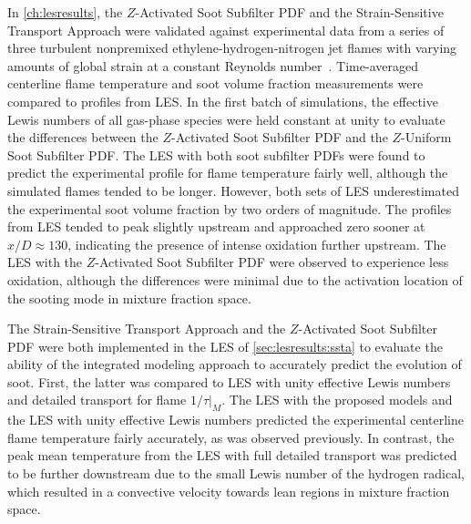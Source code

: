 In \cref{ch:lesresults}, the $Z$-Activated Soot Subfilter PDF and the Strain-Sensitive Transport Approach were validated against experimental data from a series of three turbulent nonpremixed ethylene-hydrogen-nitrogen jet flames with varying amounts of global strain at a constant Reynolds number~\cite{mahmoud2017}. Time-averaged centerline flame temperature and soot volume fraction measurements were compared to profiles from LES. In the first batch of simulations, the effective Lewis numbers of all gas-phase species were held constant at unity to evaluate the differences between the $Z$-Activated Soot Subfilter PDF and the $Z$-Uniform Soot Subfilter PDF. The LES with both soot subfilter PDFs were found to predict the experimental profile for flame temperature fairly well, although the simulated flames tended to be longer. However, both sets of LES underestimated the experimental soot volume fraction by two orders of magnitude. The profiles from LES tended to peak slightly upstream and approached zero sooner at $x/D \approx 130$, indicating the presence of intense oxidation further upstream. The LES with the $Z$-Activated Soot Subfilter PDF were observed to experience less oxidation, although the differences were minimal due to the activation location of the sooting mode in mixture fraction space.

The Strain-Sensitive Transport Approach and the $Z$-Activated Soot Subfilter PDF were both implemented in the LES of \cref{sec:lesresults:ssta} to evaluate the ability of the integrated modeling approach to accurately predict the evolution of soot. First, the latter was compared to LES with unity effective Lewis numbers and detailed transport for flame $1/\tau|_M$. The LES with the proposed models and the LES with unity effective Lewis numbers predicted the experimental centerline flame temperature fairly accurately, as was observed previously. In contrast, the peak mean temperature from the LES with full detailed transport was predicted to be further downstream due to the small Lewis number of the hydrogen radical, which resulted in a convective velocity towards lean regions in mixture fraction space.

